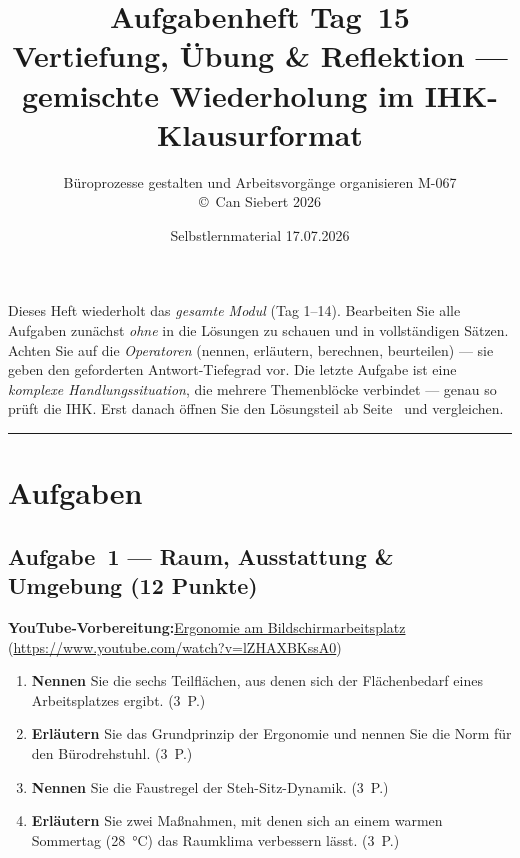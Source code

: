 \documentclass[11pt, a4paper]{article}
\title{\vspace*{-1.5cm}\Huge\bfseries\color{bfwPrimaryDark}Aufgabenheft Tag~15\\[0.4em]
  \large\color{bfwInkSoft}\textnormal{Vertiefung, Übung \& Reflektion --- gemischte Wiederholung im IHK-Klausurformat}}
\author{\textsf{Büroprozesse gestalten und Arbeitsvorgänge organisieren \textperiodcentered{} M-067}\\
\textsf{\small\copyright\ Can Siebert\,\textperiodcentered\,2026}}
\date{Selbstlernmaterial \textperiodcentered{} 17.07.2026}
\begin{document}
\maketitle
\thispagestyle{empty}

\begin{merksatz}[title={\bfseries So nutzen Sie dieses Aufgabenheft}]
Dieses Heft wiederholt das \emph{gesamte Modul} (Tag 1--14). Bearbeiten Sie alle Aufgaben
zunächst \emph{ohne} in die Lösungen zu schauen und in vollständigen Sätzen. Achten Sie
auf die \emph{Operatoren} (nennen, erläutern, berechnen, beurteilen) --- sie geben den
geforderten Antwort-Tiefegrad vor. Die letzte Aufgabe ist eine \emph{komplexe
Handlungssituation}, die mehrere Themenblöcke verbindet --- genau so prüft die IHK.
Erst danach öffnen Sie den Lösungsteil ab Seite~\pageref{loesungen} und vergleichen.
\end{merksatz}

\tableofcontents
\vspace{1em}
\hrule

\section{Aufgaben}

\subsection*{Aufgabe~1 --- Raum, Ausstattung \& Umgebung (12 Punkte)}

\noindent\textbf{\color{bfwAccent}YouTube-Vorbereitung:}\enspace \href{https://www.youtube.com/watch?v=lZHAXBKssA0}{Ergonomie am Bildschirmarbeitsplatz} (\url{https://www.youtube.com/watch?v=lZHAXBKssA0})

\medskip
\begin{enumerate}[label=(\alph*)]
  \item \textbf{Nennen} Sie die sechs Teilflächen, aus denen sich der Flächenbedarf eines Arbeitsplatzes ergibt. \hfill (3~P.)
  \item \textbf{Erläutern} Sie das Grundprinzip der Ergonomie und nennen Sie die Norm für den Bürodrehstuhl. \hfill (3~P.)
  \item \textbf{Nennen} Sie die Faustregel der Steh-Sitz-Dynamik. \hfill (3~P.)
  \item \textbf{Erläutern} Sie zwei Maßnahmen, mit denen sich an einem warmen Sommertag (28~°C) das Raumklima verbessern lässt. \hfill (3~P.)
\end{enumerate}
\end{document}
